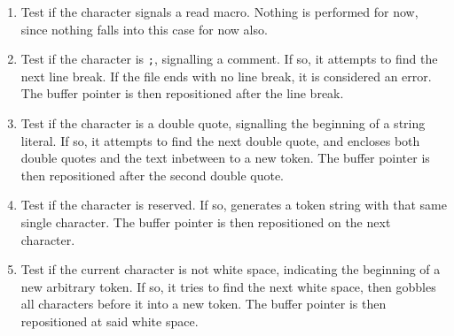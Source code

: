 \documentclass[openright,a4paper,twoside,12pt]{memoir}
\begin{document}
\begin{enumerate}
\item Test  if the character signals  a read macro. Nothing  is performed
for now, since nothing falls into this case for now also.
\item Test if  the  character is  \texttt{;},  signalling a  comment.  If so,  it
attempts to find the next line break. If the file ends with no line
break,  it is  considered  an  error. The  buffer  pointer is  then
repositioned after the line break.
\item Test if  the character is a double quote,  signalling the beginning
of a  string literal. If  so, it attempts  to find the  next double
quote, and encloses both double quotes  and the text inbetween to a
new token. The buffer pointer is then repositioned after the second
double quote.
\item Test if the character is  reserved. If so, generates a token string
with  that  same  single  character. The  buffer  pointer  is  then
repositioned on the next character.
\item Test  if the current character  is not white space,  indicating the
beginning of  a new arbitrary  token. If so,  it tries to  find the
next white space, then gobbles all  characters before it into a new
token.  The  buffer pointer  is  then  repositioned at  said  white
space.
\end{enumerate}
\end{document}
